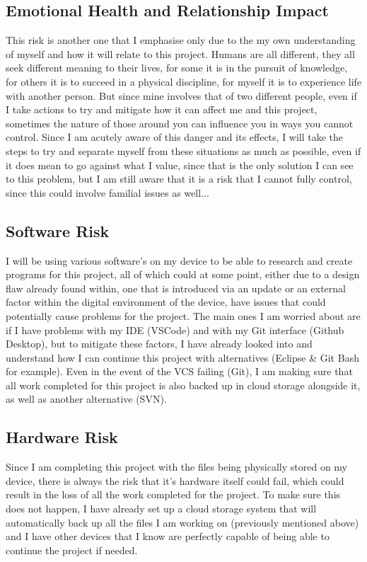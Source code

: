\documentclass{article}
\begin{document}
\subsection{Emotional Health and Relationship Impact}
This risk is another one that I emphasise only due to the my own understanding of myself and how it will relate to this project. Humans are all different, they all seek different meaning to their lives, for some it is in the pursuit of knowledge, for others it is to succeed in a physical discipline, for myself it is to experience life with another person. But since mine involves that of two different people, even if I take actions to try and mitigate how it can affect me and this project, sometimes the nature of those around you can influence you in ways you cannot control. Since I am acutely aware of this danger and its effects, I will take the steps to try and separate myself from these situations as much as possible, even if it does mean to go against what I value, since that is the only solution I can see to this problem, but I am still aware that it is a risk that I cannot fully control, since this could involve familial issues as well...

\subsection{Software Risk}
I will be using various software's on my device to be able to research and create programs for this project, all of which could at some point, either due to a design flaw already found within, one that is introduced via an update or an external factor within the digital environment of the device, have issues that could potentially cause problems for the project. The main ones I am worried about are if I have problems with my IDE (VSCode) and with my Git interface (Github Desktop), but to mitigate these factors, I have already looked into and understand how I can continue this project with alternatives (Eclipse \& Git Bash for example). Even in the event of the VCS failing (Git), I am making sure that all work completed for this project is also backed up in cloud storage alongside it, as well as another alternative (SVN).

\subsection{Hardware Risk}
Since I am completing this project with the files being physically stored on my device, there is always the risk that it's hardware itself could fail, which could result in the loss of all the work completed for the project. To make sure this does not happen, I have already set up a cloud storage system that will automatically back up all the files I am working on (previously mentioned above) and I have other devices that I know are perfectly capable of being able to continue the project if needed.
\end{document}
